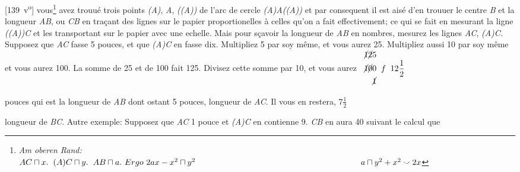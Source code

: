[139~v\textsuperscript{o}] vous\footnote{\textit{Am oberen Rand:}\\ $AC \sqcap x. \hspace{2mm} (A)C \sqcap y. \hspace{2mm} AB \sqcap a.\ Ergo\ 2ax - x^2 \sqcap y^2 \\\hspace{70mm} a \sqcap y^2 + x^2 \smallsmile 2x$} avez trouu\'{e} trois points \textit{(A)}, \textit{A}, \textit{((A))} de l'arc de cercle \textit{(A)A((A))} et par consequent il est ais\'{e} d'en trouuer le centre \textit{B} et la longueur \textit{AB}, ou \textit{CB} en tra\c{c}ant des lignes sur le papier proportionelles \`{a} celles qu'on a fait effectivement; ce qui se fait en mesurant la ligne  \textit{((A))C} et les transportant sur le papier avec une echelle.\pend
\pstart Mais pour s\c{c}avoir la longueur de \textit{AB} en nombres, mesurez les lignes \textit{AC}, \textit{(A)C}. Supposez que \textit{AC} fasse 5 pouces, et que \textit{(A)C} en fasse dix. Multipliez 5 par soy même, et vous aurez 25. Multipliez aussi 10 par soy même et vous aurez 100. La somme de 25 et de 100 fait 125. Divisez cette somme  par 10, et vous aurez $\protect\begin{array}{l} \cancel{1}\cancel{2}5\\\cancel{1}\cancel{0}0 \hspace{5.5pt}f\hspace{5.5pt}12\protect\displaystyle\protect\frac{1}{2}\\~~~\cancel{1}\protect\end{array}$\rule[-9mm]{0mm}{23mm} pouces qui est la longueur de \textit{AB} dont ostant 5 pouces, longueur de \textit{AC}. Il vous en restera, $7\displaystyle\frac{1}{2}$\rule[-4mm]{0mm}{10mm} longueur de \textit{BC}. Autre exemple: Supposez que \textit{AC}  1 pouce et \textit{(A)C} en contienne 9. \textit{CB} en aura 40 suivant le calcul que \\
